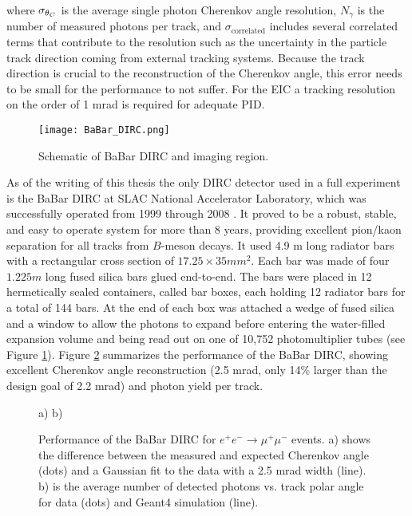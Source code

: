where $\sigma_{\theta_{C}}$ is the average single photon Cherenkov angle resolution, $N_{\gamma}$ is the number of measured photons per track, and $\sigma_{\text{correlated}}$ includes several correlated terms that contribute to the resolution such as the uncertainty in the particle track direction coming from external tracking systems. Because the track direction is crucial to the reconstruction of the Cherenkov angle, this error needs to be small for the performance to not suffer. For the EIC a tracking resolution on the order of 1 mrad is required for adequate PID.

\begin{figure}[ht]
	\centering
	\texttt{[image: BaBar\_DIRC.png]}
	\caption{Schematic of BaBar DIRC and imaging region.}
	\label{fig:babardirc}
\end{figure}

As of the writing of this thesis the only DIRC detector used in a full experiment is the BaBar DIRC at SLAC National Accelerator Laboratory, which was successfully operated from 1999 through 2008 \cite{BaBarDIRC}. It proved to be a robust, stable, and easy to operate system for more than 8 years, providing excellent pion/kaon separation for all tracks from $B$-meson decays. It used 4.9 m long radiator bars with a rectangular cross section of $17.25 \times 35 \unit{mm}^2$. Each bar was made of four $1.225\unit{m}$ long fused silica bars glued end-to-end. The bars were placed in 12 hermetically sealed containers, called bar boxes, each holding 12 radiator bars for a total of 144 bars. At the end of each box was attached a wedge of fused silica and a window to allow the photons to expand before entering the water-filled expansion volume and being read out on one of 10,752 photomultiplier tubes (see Figure \ref{fig:babardirc}). Figure \ref{fig:babarperformance} summarizes the performance of the BaBar DIRC, showing excellent Cherenkov angle reconstruction (2.5 mrad, only 14\% larger than the design goal of 2.2 mrad) and photon yield per track.

\begin{figure}[ht]
	\centering
	a)%
	b)%
	\caption{Performance of the BaBar DIRC for $e^{+}e^{-} \rightarrow \mu^{+}\mu^{-}$ events. a) shows the difference between the measured and expected Cherenkov angle (dots) and a Gaussian fit to the data with a 2.5 mrad width (line). b) is the average number of detected photons vs. track polar angle for data (dots) and Geant4 simulation (line).}
	\label{fig:babarperformance}
\end{figure}

